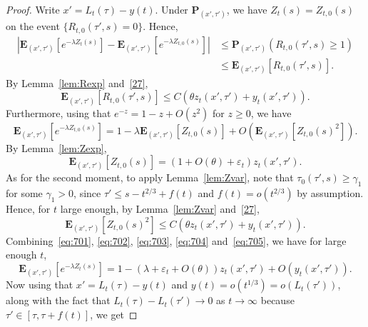 \documentclass[AHL,Unicode,longabstracts,published]{cedram}
\newcommand*\eps{\varepsilon}
\newcommand*\E{\mathbf{E}}
\renewcommand*\P{\mathbf{P}}
\newcommand{\1} {\mathds{1}}
\begin{document}
\begin{proof}
Write $x' = L_t(\tau) - y(t)$. Under $\P_{(x',\tau')}$, we have $Z_t(s) = Z_{t,0}(s)$ on the event $\{R_{t,0}(\tau',s) = 0\}$. Hence,
\begin{equation}\label{eq:701}
\begin{split}
\left|\E_{\left(x',\tau'\right)}\left[e^{-\lambda Z_t(s)}\right] - \E_{\left(x',\tau'\right)}\left[e^{-\lambda Z_{t,0}(s)}\right]\right| &\le \P_{(x',\tau')}\left(R_{t,0}\left(\tau',s\right) \ge 1\right)\\
&\le \E_{\left(x',\tau'\right)}\left[R_{t,0}\left(\tau',s\right)\right].
\end{split}
\end{equation}
By Lemma~\ref{lem:Rexp} and~\eqref{27},
\begin{equation}\label{eq:702}
\E_{\left(x',\tau'\right)}\left[R_{t,0}\left(\tau',s\right)\right] \le C\left(\theta z_t\left(x',\tau'\right) + y_t\left(x',\tau'\right)\right).
\end{equation}
Furthermore, using that $e^{-z} = 1-z+O(z^2)$ for $z\ge 0$, we have
\begin{equation}\label{eq:703}
\E_{\left(x',\tau'\right)}\left[e^{-\lambda Z_{t,0}(s)}\right] = 1 - \lambda \E_{\left(x',\tau'\right)}\left[Z_{t,0}(s)\right] + O\left(\E_{\left(x',\tau'\right)}\left[Z_{t,0}(s)^2\right]\right).
\end{equation}
By Lemma~\ref{lem:Zexp},
\begin{equation}\label{eq:704}
\E_{(x',\tau')}[Z_{t,0}(s)] = (1+O(\theta) + \eps_t) z_t(x',\tau').
\end{equation}
As for the second moment, to apply Lemma~\ref{lem:Zvar}, note that $\tau_0(\tau',s) \ge \gamma_1$ for some $\gamma_1>0$, since $\tau' \le s-t^{2/3} + f(t)$ and $f(t) = o(t^{2/3})$ by assumption. Hence, for $t$ large enough, by Lemma~\ref{lem:Zvar} and~\eqref{27},
\begin{equation}\label{eq:705}
\E_{\left(x',\tau'\right)}\left[Z_{t,0}(s)^2\right] \le C\left(\theta z_t\left(x',\tau'\right) + y_t\left(x',\tau'\right)\right).
\end{equation}
Combining~\eqref{eq:701}, \eqref{eq:702}, \eqref{eq:703}, \eqref{eq:704} and~\eqref{eq:705}, we have for large enough $t$,
\begin{equation}\label{eq:706}
\E_{\left(x',\tau'\right)}\left[e^{-\lambda Z_t(s)}\right] = 1 - \left(\lambda +\eps_t+O(\theta)\right) z_t\left(x',\tau'\right) + O\left(y_t\left(x',\tau'\right)\right).
\end{equation}
Now using that $x' = L_t(\tau) - y(t)$ and $y(t) = o(t^{1/3}) = o(L_t(\tau'))$, along with the fact that $L_t(\tau) - L_t(\tau') \rightarrow 0$ as $t \rightarrow \infty$ because $\tau' \in [\tau, \tau + f(t)]$, we get

\end{proof}
\end{document}
